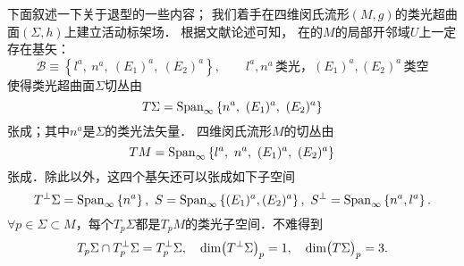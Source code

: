 %    
%

下面叙述一下关于退型的一些内容；
我们着手在四维闵氏流形$(M,g)$的类光超曲面$(\Sigma,h)$上建立活动标架场．
根据文献\parencite[p.90-92]{Duggal-Bejancu-1996}论述可知，
在的$M$的局部开邻域$U$上一定存在基矢：
\begin{equation}\label{chnull:eqn_bases}
    \mathcal{B} \equiv \left\{ l^a, \  n^a,
    \   (E_1)^a,\  (E_2)^a \right\} , \qquad
    l^a, n^a \, \text{类光，} (E_1)^a, (E_2)^a\, \text{类空}
\end{equation}
使得类光超曲面$\Sigma$切丛由
\begin{equation}\label{chnull:eqn_SigmaAll}
    T\Sigma={\rm Span}_{\infty}\left\{ n^a, \   (E_1)^a,\   (E_2)^a \right\}
\end{equation}
张成；其中$n^a$是$\Sigma$的类光法矢量．
四维闵氏流形$M$的切丛由
\begin{equation}
    TM={\rm Span}_{\infty}\left\{ l^a,  \   n^a, \   (E_1)^a,\   (E_2)^a \right\}
\end{equation}
张成．除此以外，这四个基矢还可以张成如下子空间    %
\begin{equation*}
    T^\perp\Sigma={\rm Span}_{\infty} \left\{ n^a \right\},\
    S={\rm Span}_{\infty}\left\{  (E_1)^a,  (E_2)^a \right\},\
    S^\perp={\rm Span}_{\infty}\left\{ n^a,  l^a \right\} . 
\end{equation*} %
$\forall p\in \Sigma \subset M$，每个$T_p\Sigma$都是$T_pM$的类光子空间．不难得到
\begin{equation}
    T_p\Sigma \cap T_p^\perp \Sigma = T_p^\perp\Sigma,\quad 
    {\rm dim}\bigl(T^\perp \Sigma\bigr)_p =1,
    \quad {\rm dim}\bigl(T \Sigma\bigr)_p =3.
\end{equation}



